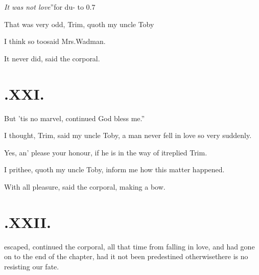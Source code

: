 \documentclass{article}
\begin{document}
\tsh \lqq\textit{It was not love}”\tsh for du-\break
{}
\hbox to 0.7

That was very odd, Trim, quoth my uncle Toby\tsh

I think so too\tsk said Mrs.\@ Wadman.

It never did, said the corporal.

\vfill{}\eject\null
\section{.\enspace XXI.}

\quad\tsh But ’tis no marvel, continued\break 
{}
\lqq God bless me.”

\vfill{}\eject

I thought, Trim, said my uncle\break
Toby, a man never fell in love so very\break
suddenly.

Yes, an’ please your honour, if\break
he is in the way of it\tsh replied\break
Trim.

I prithee, quoth my uncle Toby,\break
inform me how this matter happened.

\tsh With all pleasure, said the corporal, making a
bow.

\vfill{}\eject\null
\section{.\enspace XXII.}

 escaped, continued the
corporal, all that time from falling in love, and had gone on to
the end of the chapter, had it not been predestined
otherwise\tsh\break there is no resisting our fate.
\end{document}
